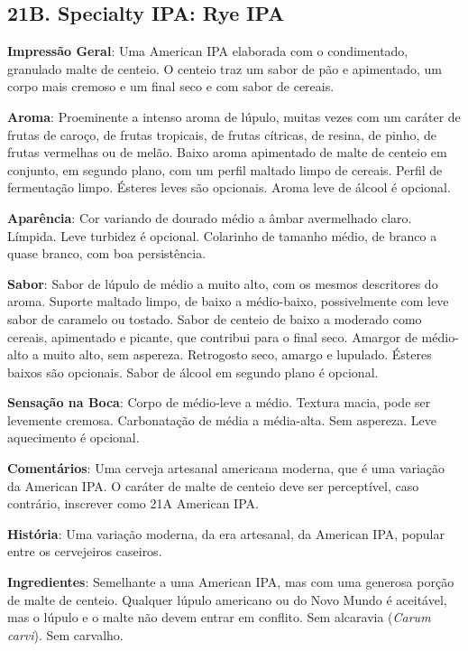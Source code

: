 \subsection*{21B. Specialty IPA: Rye IPA}
\textbf{Impressão Geral}: Uma American IPA elaborada com o condimentado, granulado malte de centeio. O centeio traz um sabor de pão e apimentado, um corpo mais cremoso e um final seco e com sabor de cereais.

\textbf{Aroma}: Proeminente a intenso aroma de lúpulo, muitas vezes com um caráter de frutas de caroço, de frutas tropicais, de frutas cítricas, de resina, de pinho, de frutas vermelhas ou de melão. Baixo aroma apimentado de malte de centeio em conjunto, em segundo plano, com um perfil maltado limpo de cereais. Perfil de fermentação limpo. Ésteres leves são opcionais. Aroma leve de álcool é opcional.

\textbf{Aparência}: Cor variando de dourado médio a âmbar avermelhado claro. Límpida. Leve turbidez é opcional. Colarinho de tamanho médio, de branco a quase branco, com boa persistência.

\textbf{Sabor}: Sabor de lúpulo de médio a muito alto, com os mesmos descritores do aroma. Suporte maltado limpo, de baixo a médio-baixo, possivelmente com leve sabor de caramelo ou tostado. Sabor de centeio de baixo a moderado como cereais, apimentado e picante, que contribui para o final seco. Amargor de médio-alto a muito alto, sem aspereza. Retrogosto seco, amargo e lupulado. Ésteres baixos são opcionais. Sabor de álcool em segundo plano é opcional.

\textbf{Sensação na Boca}: Corpo de médio-leve a médio. Textura macia, pode ser levemente cremosa. Carbonatação de média a média-alta. Sem aspereza. Leve aquecimento é opcional.

\textbf{Comentários}: Uma cerveja artesanal americana moderna, que é uma variação da American IPA. O caráter de malte de centeio deve ser perceptível, caso contrário, inscrever como 21A American IPA.

\textbf{História}: Uma variação moderna, da era artesanal, da American IPA, popular entre os cervejeiros caseiros.

\textbf{Ingredientes}: Semelhante a uma American IPA, mas com uma generosa porção de malte de centeio. Qualquer lúpulo americano ou do Novo Mundo é aceitável, mas o lúpulo e o malte não devem entrar em conflito. Sem alcaravia (\textit{Carum carvi}). Sem carvalho.

